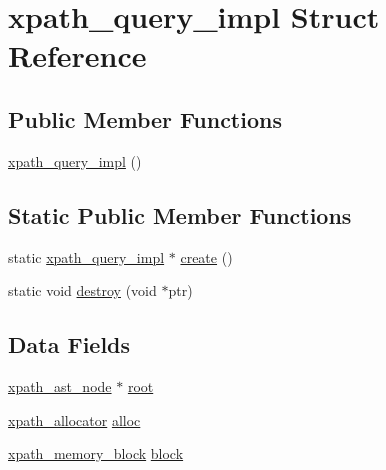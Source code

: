\hypertarget{structxpath__query__impl}{\section{xpath\-\_\-query\-\_\-impl Struct Reference}
\label{structxpath__query__impl}
}
\subsection*{Public Member Functions}
\begin{DoxyCompactItemize}
\item 
\hyperlink{structxpath__query__impl_a57ef8fcfa3f46e6c395edb00328e9a0e}{xpath\-\_\-query\-\_\-impl} ()
\end{DoxyCompactItemize}
\subsection*{Static Public Member Functions}
\begin{DoxyCompactItemize}
\item 
static \hyperlink{structxpath__query__impl}{xpath\-\_\-query\-\_\-impl} $\ast$ \hyperlink{structxpath__query__impl_afcf45bb9a20a4117b1e963d83277aa7f}{create} ()
\item 
static void \hyperlink{structxpath__query__impl_a9b7194b1356cca3f3b62f4cdb8d8960f}{destroy} (void $\ast$ptr)
\end{DoxyCompactItemize}
\subsection*{Data Fields}
\begin{DoxyCompactItemize}
\item 
\hyperlink{classxpath__ast__node}{xpath\-\_\-ast\-\_\-node} $\ast$ \hyperlink{structxpath__query__impl_ad25499e0c8391005e3a1a60633d631fe}{root}
\item 
\hyperlink{classxpath__allocator}{xpath\-\_\-allocator} \hyperlink{structxpath__query__impl_ae568b8642d48e729f2ccc2a50467c847}{alloc}
\item 
\hyperlink{structxpath__memory__block}{xpath\-\_\-memory\-\_\-block} \hyperlink{structxpath__query__impl_a3a8af3ceed6a504567656ec6d1b62641}{block}
\end{DoxyCompactItemize}


